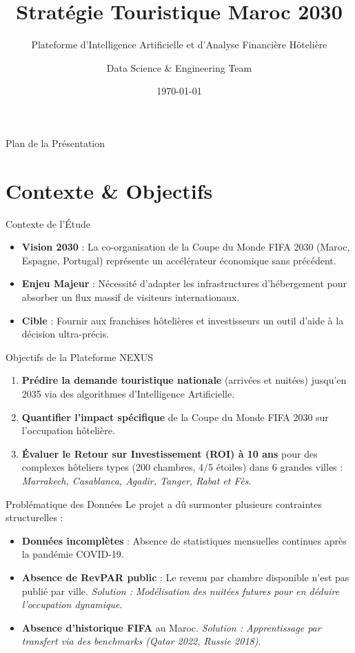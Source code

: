 \documentclass[aspectratio=169]{beamer}
\title[Morocco 2030: Tourism \& ROI]{Stratégie Touristique Maroc 2030}
\subtitle{Plateforme d'Intelligence Artificielle et d'Analyse Financière Hôtelière}
\author{Data Science \& Engineering Team}
\date{\today}
\begin{document}
\begin{frame}
    \titlepage
\end{frame}

\begin{frame}{Plan de la Présentation}
    \tableofcontents[hideallsubsections]
\end{frame}

\section{Contexte \& Objectifs}
\begin{frame}{Contexte de l'Étude}
    \begin{itemize}
        \item \textbf{Vision 2030} : La co-organisation de la Coupe du Monde FIFA 2030 (Maroc, Espagne, Portugal) représente un accélérateur économique sans précédent.
        \item \textbf{Enjeu Majeur} : Nécessité d'adapter les infrastructures d'hébergement pour absorber un flux massif de visiteurs internationaux.
        \item \textbf{Cible} : Fournir aux franchises hôtelières et investisseurs un outil d'aide à la décision ultra-précis.
    \end{itemize}
\end{frame}

\begin{frame}{Objectifs de la Plateforme NEXUS}
    \begin{enumerate}
        \item \textbf{Prédire la demande touristique nationale} (arrivées et nuitées) jusqu'en 2035 via des algorithmes d'Intelligence Artificielle.
        \item \textbf{Quantifier l'impact spécifique} de la Coupe du Monde FIFA 2030 sur l'occupation hôtelière.
        \item \textbf{Évaluer le Retour sur Investissement (ROI) à 10 ans} pour des complexes hôteliers types (200 chambres, 4/5 étoiles) dans 6 grandes villes : \textit{Marrakech, Casablanca, Agadir, Tanger, Rabat et Fès}.
    \end{enumerate}
\end{frame}

\begin{frame}{Problématique des Données}
    Le projet a dû surmonter plusieurs contraintes structurelles :
    \vspace{0.3cm}
    \begin{itemize}
        \item \textbf{Données incomplètes} : Absence de statistiques mensuelles continues après la pandémie COVID-19.
        \item \textbf{Absence de RevPAR public} : Le revenu par chambre disponible n'est pas publié par ville. \textit{Solution : Modélisation des nuitées futures pour en déduire l'occupation dynamique}.
        \item \textbf{Absence d'historique FIFA} au Maroc. \textit{Solution : Apprentissage par transfert via des benchmarks (Qatar 2022, Russie 2018)}.
    \end{itemize}
\end{frame}
\end{document}
